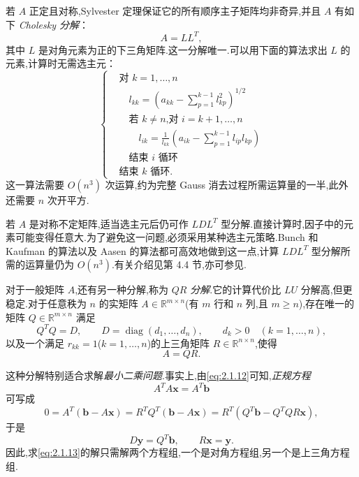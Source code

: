 若 \(A\) 正定且对称,Sylvester 定理保证它的所有顺序主子矩阵均非奇异,并且 \(A\) 有如下 \emph{Cholesky 分解}：
\begin{equation}\label{eq:2.1.9}
  A=LL^T,
\end{equation}
其中 \(L\) 是对角元素为正的下三角矩阵.这一分解唯一.可以用下面的算法求出 \(L\) 的元素,计算时无需选主元：
\begin{equation}\label{eq:2.1.10}
  \left\{
  \begin{aligned}
    &\text{对 }k=1,\ldots,n\\
    &\quad l_{kk}=\left(a_{kk}-\sum_{p=1}^{k-1}l_{kp}^2\right)^{1/2}\\
    &\quad\text{若 \(k\ne n\),对 }i=k+1,\ldots,n\\
    &\qquad l_{ik}=\frac1{l_{kk}}\left(a_{ik}-\sum_{p=1}^{k-1}l_{ip}l_{kp}\right)\\
    &\quad\text{结束 \(i\) 循环}\\
    &\text{结束 \(k\) 循环.}
  \end{aligned}
  \right.
\end{equation}
这一算法需要 \(O(n^3)\) 次运算,约为完整 Gauss 消去过程所需运算量的一半,此外还需要 \(n\) 次开平方.

若 \(A\) 是对称不定矩阵,适当选主元后仍可作 \(LDL^T\) 型分解.直接计算时,因子中的元素可能变得任意大.为了避免这一问题,必须采用某种选主元策略.Bunch 和 Kaufman 的算法以及 Aasen 的算法都可高效地做到这一点,计算 \(LDL^T\) 型分解所需的运算量仍为 \(O(n^3)\).有关介绍见第 4.4 节,亦可参见.

对于一般矩阵 \(A\),还有另一种分解,称为 \emph{\(QR\) 分解}.它的计算代价比 \(LU\) 分解高,但更稳定.对于任意秩为 \(n\) 的实矩阵 \(A\in\mathbb R^{m\times n}\)(有 \(m\) 行和 \(n\) 列,且 \(m\ge n\)),存在唯一的矩阵 \(Q\in\mathbb R^{m\times n}\) 满足
\begin{equation}\label{eq:2.1.11}
  Q^TQ=D,\qquad D=\operatorname{diag}(d_1,\ldots,d_n),\qquad
  d_k>0\quad(k=1,\ldots,n),
\end{equation}
以及一个满足 \(r_{kk}=1\)(\(k=1,\ldots,n\))的上三角矩阵 \(R\in\mathbb R^{n\times n}\),使得
\begin{equation}\label{eq:2.1.12}
  A=QR.
\end{equation}

这种分解特别适合求解\emph{最小二乘问题}.事实上,由\eqref{eq:2.1.12}可知,\emph{正规方程}
\begin{equation}\label{eq:2.1.13}
  A^TA\boldsymbol{x}=A^T\boldsymbol{b}
\end{equation}
可写成
\[
  0=A^T(\boldsymbol{b}-A\boldsymbol{x})=R^TQ^T(\boldsymbol{b}-A\boldsymbol{x})
    =R^T(Q^T\boldsymbol{b}-Q^TQR\boldsymbol{x}),
\]
于是
\begin{equation}\label{eq:2.1.14}
  D\boldsymbol{y}=Q^T\boldsymbol{b},\qquad R\boldsymbol{x}=\boldsymbol{y}.
\end{equation}
因此,求\eqref{eq:2.1.13}的解只需解两个方程组,一个是对角方程组,另一个是上三角方程组.

